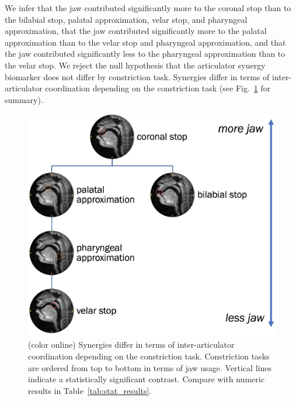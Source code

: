 \documentclass[preprint]{JASAnew}\usepackage[]{graphicx}\usepackage[]{color}
\begin{document}
We infer that the jaw contributed significantly more to the coronal stop than to the bilabial stop, palatal approximation, velar stop, and pharyngeal approximation,
%
that the jaw contributed significantly more to the palatal approximation than to the velar stop and pharyngeal approximation,
%
and that the jaw contributed significantly less to the pharyngeal approximation than to the velar stop.
%
We reject the null hypothesis that the articulator synergy biomarker does not differ by constriction task. 
%
Synergies differ in terms of inter-articulator coordination depending on the constriction task (see Fig.~\ref{fig:task_spec_summary} for summary).


\begin{figure}
\includegraphics[width=\linewidth]{task_spec_summary.png}

\caption{(color online) Synergies differ in terms of inter-articulator coordination depending on the constriction task. Constriction tasks are ordered from top to bottom in terms of jaw usage. Vertical lines indicate a statistically significant contrast. Compare with numeric results in Table~\ref{tab:stat_results}.}
\label{fig:task_spec_summary}
\end{figure}
\end{document}
